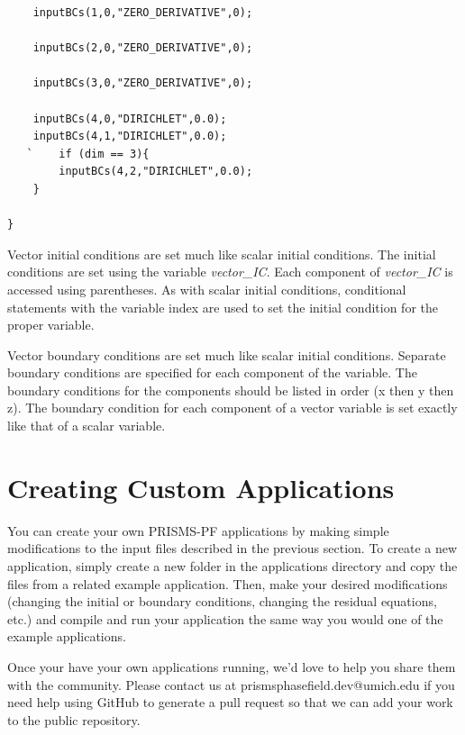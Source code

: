 \documentclass[10pt]{article} %
\begin{document}
\begin{lstlisting}
	inputBCs(1,0,"ZERO_DERIVATIVE",0);

	inputBCs(2,0,"ZERO_DERIVATIVE",0);

	inputBCs(3,0,"ZERO_DERIVATIVE",0);

	inputBCs(4,0,"DIRICHLET",0.0);
	inputBCs(4,1,"DIRICHLET",0.0);
   `	if (dim == 3){
		inputBCs(4,2,"DIRICHLET",0.0);
	}

}
\end{lstlisting} \normalsize

Vector initial conditions are set much like scalar initial conditions. The initial conditions are set using the variable \emph{vector\_IC}. Each component of \emph{vector\_IC} is accessed using parentheses. As with scalar initial conditions, conditional statements with the variable index are used to set the initial condition for the proper variable.

Vector boundary conditions are set much like scalar initial conditions. Separate boundary conditions are specified for each component of the variable. The boundary conditions for the components should be listed in order (x then y then z). The boundary condition for each component of a vector variable is set exactly like that of a scalar variable.

\section{Creating Custom Applications}
You can create your own PRISMS-PF applications by making simple modifications to the input files described in the previous section. To create a new application, simply create a new folder in the applications directory and copy the files from a related example application. Then, make your desired modifications (changing the initial or boundary conditions, changing the residual equations, etc.) and compile and run your application the same way you would one of the example applications.

Once your have your own applications running, we'd love to help you share them with the community. Please contact us at prismsphasefield.dev@umich.edu if you need help using GitHub to generate a pull request so that we can add your work to the public repository.
\end{document}
